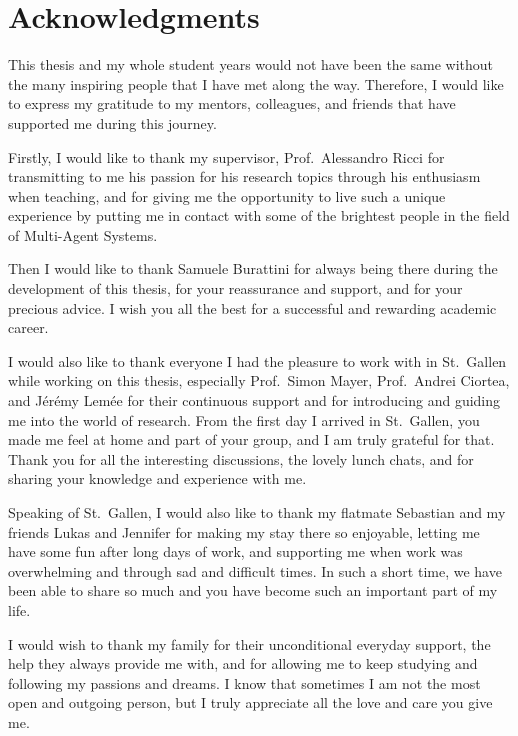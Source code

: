 \chapter*{Acknowledgments}

This thesis and my whole student years would not have been the same without the many inspiring people that I have met along the way.
Therefore, I would like to express my gratitude to my mentors, colleagues, and friends that have supported me during this journey.

Firstly, I would like to thank my supervisor, Prof.\ Alessandro Ricci for transmitting to me his passion for his research topics through his enthusiasm when teaching, and for giving me the opportunity to live such a unique experience by putting me in contact with some of the brightest people in the field of Multi-Agent Systems.

Then I would like to thank Samuele Burattini for always being there during the development of this thesis, for your reassurance and support, and for your precious advice.
I wish you all the best for a successful and rewarding academic career.

I would also like to thank everyone I had the pleasure to work with in St.\ Gallen while working on this thesis, especially Prof.\ Simon Mayer, Prof.\ Andrei Ciortea, and J\'{e}r\'{e}my Lem\'{e}e for their continuous support and for introducing and guiding me into the world of research.
From the first day I arrived in St.\ Gallen, you made me feel at home and part of your group, and I am truly grateful for that.
Thank you for all the interesting discussions, the lovely lunch chats, and for sharing your knowledge and experience with me.

Speaking of St.\ Gallen, I would also like to thank my flatmate Sebastian and my friends Lukas and Jennifer for making my stay there so enjoyable, letting me have some fun after long days of work, and supporting me when work was overwhelming and through sad and difficult times.
In such a short time, we have been able to share so much and you have become such an important part of my life.

I would wish to thank my family for their unconditional everyday support, the help they always provide me with, and for allowing me to keep studying and following my passions and dreams.
I know that sometimes I am not the most open and outgoing person, but I truly appreciate all the love and care you give me.


